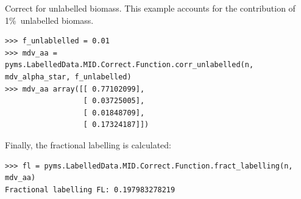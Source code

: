 Correct for unlabelled biomass. This example accounts for the contribution
of 1\%\ unlabelled biomass.

\begin{verbatim}
>>> f_unlablelled = 0.01 
>>> mdv_aa = 
pyms.LabelledData.MID.Correct.Function.corr_unlabelled(n, mdv_alpha_star, f_unlabelled)
>>> mdv_aa array([[ 0.77102099],
                  [ 0.03725005],
                  [ 0.01848709],
                  [ 0.17324187]])
\end{verbatim}

Finally, the fractional labelling is calculated:

\begin{verbatim}
>>> fl = pyms.LabelledData.MID.Correct.Function.fract_labelling(n, mdv_aa)
Fractional labelling FL: 0.197983278219
\end{verbatim}

